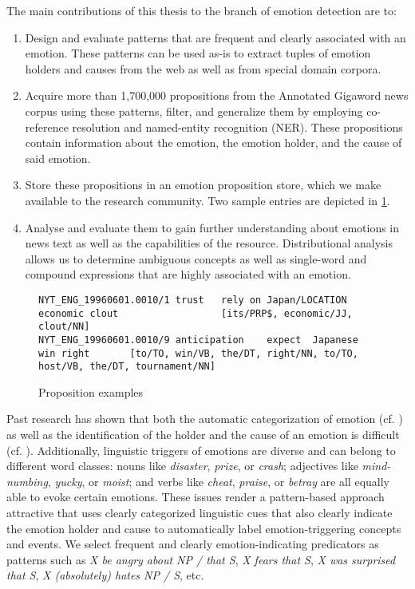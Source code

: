 The main contributions of this thesis to the branch of emotion detection are to:
\begin{enumerate}[noitemsep]
	\item Design and evaluate patterns that are frequent and clearly associated with an emotion. These patterns can be used as-is to extract tuples of emotion holders and causes from the web as well as from special domain corpora.
	\item Acquire more than 1,700,000 propositions from the Annotated Gigaword news corpus \cite{annotated_gigaword} using these patterns, filter, and generalize them by employing co-reference resolution and named-entity recognition (NER). These propositions contain information about the emotion, the emotion holder, and the cause of said emotion.
	\item Store these propositions in an emotion proposition store, which we make available to the research community. Two sample entries are depicted in \ref{fig:propositions}.
	\item Analyse and evaluate them to gain further understanding about emotions in news text as well as the capabilities of the resource. Distributional analysis allows us to determine ambiguous concepts as well as single-word and compound expressions that are highly associated with an emotion.
\end{enumerate}

\begin{figure}
\begin{lstlisting}
NYT_ENG_19960601.0010/1	trust	rely on	Japan/LOCATION	economic clout					[its/PRP$, economic/JJ, clout/NN]
NYT_ENG_19960601.0010/9	anticipation	expect	Japanese				win	right		[to/TO, win/VB, the/DT, right/NN, to/TO, host/VB, the/DT, tournament/NN]
\end{lstlisting}
\caption{Proposition examples}\label{fig:propositions}
\end{figure}

Past research has shown that both the automatic categorization of emotion (cf. \cite{emotion_verbs}) as well as the identification of the holder and the cause of an emotion is difficult (cf. \cite{emotion_holder}). Additionally, linguistic triggers of emotions are diverse and can belong to different word classes: nouns like \textit{disaster}, \textit{prize}, or \textit{crash}; adjectives like \textit{mind-numbing}, \textit{yucky}, or \textit{moist}; and verbs like \textit{cheat}, \textit{praise}, or \textit{betray} are all equally able to evoke certain emotions. These issues render a pattern-based approach attractive that uses clearly categorized linguistic cues that also clearly indicate the emotion holder and cause to automatically label emotion-triggering concepts and events. We select frequent and clearly emotion-indicating predicators as patterns such as \textit{X be angry about NP / that S}, \textit{X fears that S}, \textit{X was surprised that S}, \textit{X (absolutely) hates NP / S}, etc.

